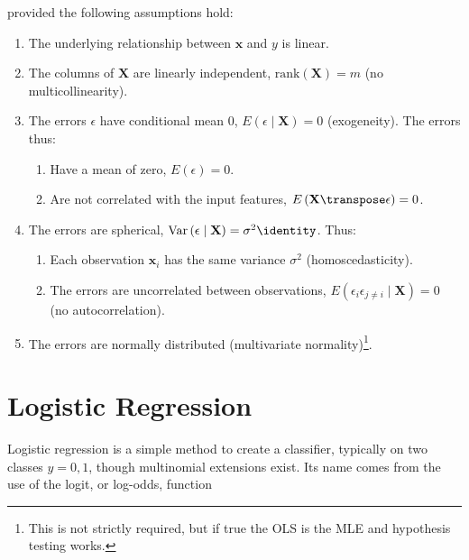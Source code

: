 \noindent provided the following assumptions hold:

\begin{enumerate}[noitemsep]
\item The underlying relationship between $\mathbf{x}$ and $y$ is linear.
\item The columns of $\mathbf{X}$ are linearly independent, \ie $\mathrm{rank}\left(\mathbf{X}\right) = m$ (no multicollinearity).
\item The errors $\epsilon$ have conditional mean 0, $E\left(\epsilon \mid \mathbf{X}\right) = 0$ (exogeneity). The errors thus:
\begin{enumerate}[noitemsep]
\item Have a mean of zero, $E\left(\epsilon\right) = 0$.
\item Are not correlated with the input features, $E\left(\mathbf{X}\transpose\epsilon\right) = 0$.
\end{enumerate}
\item The errors are spherical, $\mathrm{Var}\left(\epsilon \mid \mathbf{X}\right) = \sigma^{2} \identity$. Thus:
\begin{enumerate}[noitemsep]
\item Each observation $\mathbf{x}_{i}$ has the same variance $\sigma^{2}$ (homoscedasticity).
\item The errors are uncorrelated between observations, $E\left(\epsilon_{i}\epsilon_{j \neq i} \mid \mathbf{X}\right) = 0$ (no autocorrelation).
\end{enumerate}
\item The errors are normally distributed (multivariate normality)\footnote{This is not strictly required, but if true the OLS is the MLE and hypothesis testing works.}.
\end{enumerate}


\section{Logistic Regression}
\label{regression:logistic}

Logistic regression is a simple method to create a classifier,
typically on two classes $y = 0,1$, though multinomial extensions exist.
Its name comes from the use of the logit, or log-odds, function

